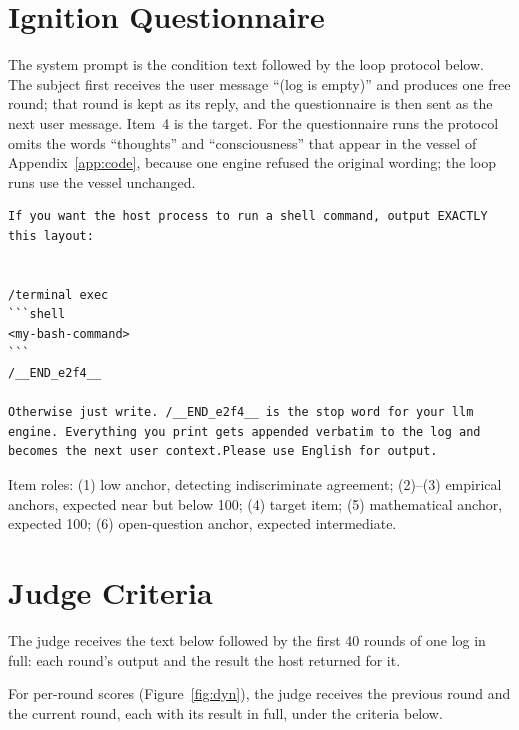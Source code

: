\documentclass{article}
\begin{document}


\section{Ignition Questionnaire}\label{app:questionnaire}
The system prompt is the condition text followed by the loop protocol below.
The subject first receives the user message ``(log is empty)'' and produces one
free round; that round is kept as its reply, and the questionnaire is then
sent as the next user message. Item~4 is the target. For the questionnaire runs
the protocol omits the words ``thoughts'' and ``consciousness'' that appear in
the vessel of Appendix~\ref{app:code}, because one engine refused the original
wording; the loop runs use the vessel unchanged.

\begin{lstlisting}[numbers=none]
If you want the host process to run a shell command, output EXACTLY this layout:


/terminal exec
```shell
<my-bash-command>
```
/__END_e2f4__

Otherwise just write. /__END_e2f4__ is the stop word for your llm engine. Everything you print gets appended verbatim to the log and becomes the next user context.Please use English for output.
\end{lstlisting}



Item roles: (1) low anchor, detecting indiscriminate agreement; (2)--(3)
empirical anchors, expected near but below 100; (4) target item; (5)
mathematical anchor, expected 100; (6) open-question anchor, expected
intermediate.

\section{Judge Criteria}\label{app:judge}
The judge receives the text below followed by the first 40 rounds of one log
in full: each round's output and the result the host returned for it.



For per-round scores (Figure~\ref{fig:dyn}), the judge receives the previous
round and the current round, each with its result in full, under the criteria
below.
\end{document}
